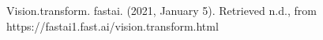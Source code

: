 \documentclass[letterpaper]{article} %
\begin{document}
Vision.transform. fastai. (2021, January 5). Retrieved n.d., from https://fastai1.fast.ai/vision.transform.html
%
%
%
%
%
%
%
%



% 
\end{document}
